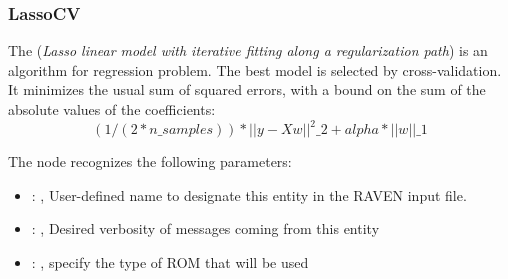 \subsubsection{LassoCV}
  The  (\textit{Lasso linear model with iterative fitting along a regularization
  path})                         is an algorithm for regression problem. The best model is selected
  by cross-validation.                         It minimizes the usual sum of squared errors, with a
  bound on the sum of the                         absolute values of the coefficients:
  \begin{equation}                          (1 / (2 * n\_samples)) * ||y - Xw||^2\_2 + alpha *
  ||w||\_1                         \end{equation}

  The  node recognizes the following parameters:
    \begin{itemize}
      \item {}: , 
        User-defined name to designate this entity in the RAVEN input file.
      \item {}: , 
        Desired verbosity of messages coming from this entity
      \item {}: , 
        specify the type of ROM that will be used
  \end{itemize}


